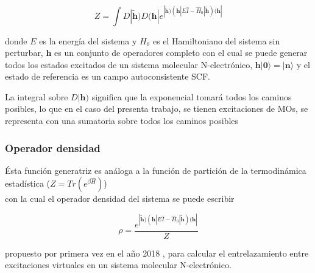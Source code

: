 \documentclass{beamer}
\begin{document}
\begin{frame}
\small
  
  \begin{equation*}\label{Z}
    Z = \int D| \bm{\widetilde{h}} ) D (\bm{h}|  e^{| \bm{\widetilde{h}} ) (\bm{h}| E \hat{I} - \hat{H}_0 | \bm{\widetilde{h}} )   (\bm{h}|}
  \end{equation*}

donde $E$ es la energía del sistema y $H_0$ es el Hamiltoniano del sistema sin perturbar, $\bm{h}$ es un conjunto de operadores 
completo con el cual se puede generar todos los estados excitados de un sistema molecular N-electrónico, 
$\bm{h} | \bm{0} \rangle = |\bm{n}\rangle$  y el estado de referencia
es un campo autoconsistente SCF.


\pause
\vfill

La integral sobre $D|\bm{h})$ significa que la exponencial tomará todos los caminos posibles, 
lo que en el caso del presenta trabajo, se tienen excitaciones de MOs, se representa con una sumatoria 
sobre todos los caminos posibles%


\end{frame}

\begin{frame}
  \frametitle{Operador densidad}

  Ésta función generatriz es análoga a la función de partición de la termodinámica estadística  
($Z = Tr (e^{\beta \hat{H}})$) \\ con la cual el operador densidad  del sistema se puede escribir


\begin{equation*}
	\rho = \frac{e^{| \bm{\widetilde{h}} ) (\bm{h}| E \hat{I} - \hat{H}_0 | \bm{\widetilde{h}} )   (\bm{h}|}}
	{Z}
\end{equation*}

propuesto por primera vez en el año 2018 , para calcular el entrelazamiento entre excitaciones virtuales 
en un sistema molecular N-electrónico.


\end{frame}
\end{document}
